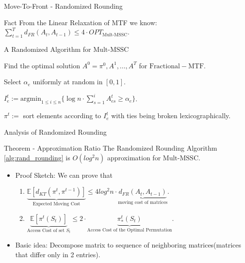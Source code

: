 \documentclass{beamer}
\def\DSSC{\mathrm{Mult}\text{-}\mathrm{MSSC}}
\begin{document}
\begin{frame}{Move-To-Front - Randomized Rounding}
        \begin{block}{Fact}
            From the Linear Relaxation of MTF we know: $\sum_{t=1}^T d_{FR}( A_t, A_{t-1} ) \leq 4 \cdot OPT_{\DSSC}$.
        \end{block}
        \begin{block}{A Randomized Algorithm for $\DSSC$}
            \begin{algorithmic}[1]\label{alg:rand_rounding}
 \STATE Find the optimal solution $A^0=\pi^0,A^1,\ldots,A^T$ for $\mathrm{Fractional-MTF}$. 

        \STATE Select $\alpha_e$ uniformly at random in $[0,1]$.
        \ENDFOR

              
                \STATE $I_e^t := \mathrm{argmin}_{1\leq i \leq n} \{ \log n \cdot \sum_{s=1}^i 
                A_{es}^t \geq \alpha_e\}$.
        \ENDFOR
            
            \STATE $\pi^t:=$ sort elements according to $I_e^t$ with ties being broken lexicographically.
\ENDFOR
  \end{algorithmic}
        \end{block}
\end{frame}

\begin{frame}{Analysis of Randomized Rounding}
        \begin{block}{Theorem - Approximation Ratio}
            The Randomized Rounding Algorithm \ref{alg:rand_rounding} is $O(log^2 n)$ approximation for $\DSSC$.
        \end{block}
    
    \begin{itemize}
            \item Proof Sketch: We can prove that
        
            \begin{enumerate}
                \item $\underbrace{\mathbb{E}[ d_{KT} ( \pi^t, \pi^{t-1} ) ]}_{\text{Expected Moving Cost}} \leq 4 log^2 n \cdot \underbrace{d_{FR} (A_t, A_{t-1})}_{\text{moving cost of matrices}}$. \\
            
                \item $\underbrace{\mathbb{E}[ \pi^t( S_t) ]}_{\text{Access Cost of set } S_t} \leq 2 \cdot \underbrace{\pi^t_{*} ( S_t )}_{\text{Access Cost of the Optimal Permutation}}$.
        \end{enumerate}
         \item Basic idea: Decompose matrix to sequence of neighboring matrices(matrices that differ only in 2 entries).
    \end{itemize}
\end{frame}
\end{document}
